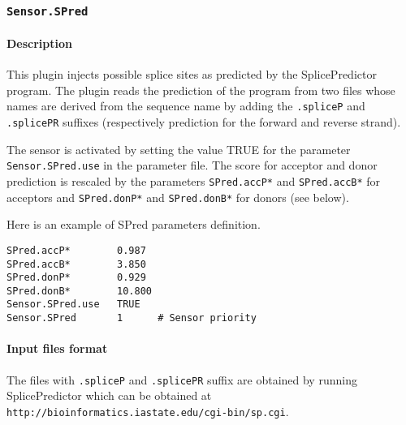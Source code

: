 
\subsubsection{\texttt{Sensor.SPred}}

\paragraph{Description}

This plugin injects possible splice sites as predicted by the
SplicePredictor program. The plugin reads the prediction of
the program from two files whose names are derived from the sequence
name by adding the \texttt{.spliceP} and \texttt{.splicePR} suffixes
(respectively prediction for the forward and reverse strand).

The sensor is activated by setting the value TRUE for the parameter
\texttt{Sensor.SPred.use} in the parameter file. The score for acceptor
and donor prediction is rescaled by the parameters {\tt SPred.accP*} and
{\tt SPred.accB*} for acceptors and {\tt SPred.donP*} and {\tt SPred.donB*} for
donors (see below).

Here is an example of SPred parameters definition.
\begin{Verbatim}[fontsize=\small]
SPred.accP*        0.987
SPred.accB*        3.850
SPred.donP*        0.929
SPred.donB*        10.800
Sensor.SPred.use   TRUE
Sensor.SPred       1      # Sensor priority
\end{Verbatim}

\paragraph{Input files format}

The files with \texttt{.spliceP} and \texttt{.splicePR} suffix are
obtained by running SplicePredictor which can be obtained at
\texttt{http://bioinformatics.iastate.edu/cgi-bin/sp.cgi}.

